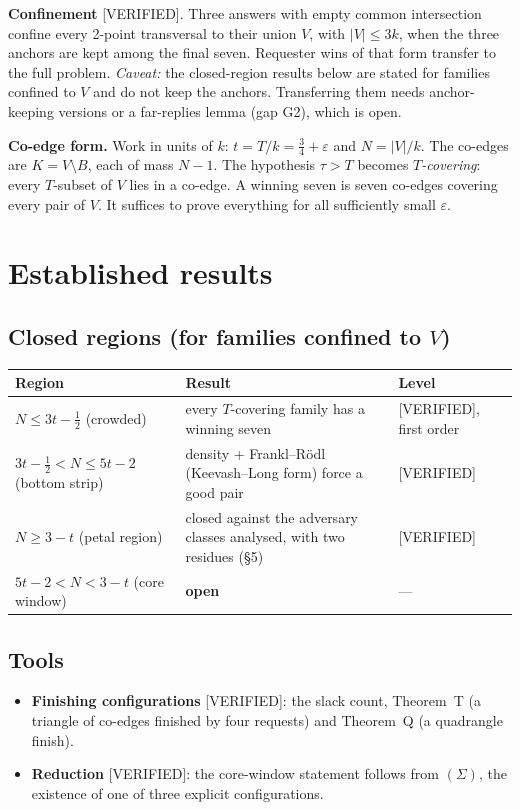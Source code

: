 \documentclass[11pt]{article}
\newcommand{\lvl}[1]{\textsf{\small[#1]}}
\begin{document}
\textbf{Confinement} \lvl{VERIFIED}. Three answers with empty common intersection confine every 2-point transversal to
their union $V$, with $|V|\le 3k$, when the three anchors are kept among the final seven. Requester wins of that form
transfer to the full problem. \emph{Caveat:} the closed-region results below are stated for families confined to $V$
and do not keep the anchors. Transferring them needs anchor-keeping versions or a far-replies lemma (gap G2), which is
open.

\textbf{Co-edge form.} Work in units of $k$: $t=T/k=\tfrac34+\varepsilon$ and $N=|V|/k$. The co-edges are
$K=V\setminus B$, each of mass $N-1$. The hypothesis $\tau>T$ becomes \emph{$T$-covering}: every $T$-subset of $V$ lies
in a co-edge. A winning seven is seven co-edges covering every pair of $V$. It suffices to prove everything for all
sufficiently small $\varepsilon$.

\section{Established results}
\subsection{Closed regions (for families confined to $V$)}
\begin{center}\small
\begin{tabular}{@{}p{5.3cm}p{6.4cm}p{3.4cm}@{}}\toprule
Region & Result & Level\\\midrule
$N\le 3t-\tfrac12$ (crowded) & every $T$-covering family has a winning seven & \lvl{VERIFIED}, first order\\
$3t-\tfrac12<N\le 5t-2$ (bottom strip) & density + Frankl--R\"odl (Keevash--Long form) force a good pair & \lvl{VERIFIED}\\
$N\ge 3-t$ (petal region) & closed against the adversary classes analysed, with two residues (\S5) & \lvl{VERIFIED}\\
$5t-2<N<3-t$ (core window) & \textbf{open} & ---\\\bottomrule
\end{tabular}
\end{center}

\subsection{Tools}
\begin{itemize}
\item \textbf{Finishing configurations} \lvl{VERIFIED}: the slack count, Theorem~T (a triangle of co-edges finished by
four requests) and Theorem~Q (a quadrangle finish).
\item \textbf{Reduction} \lvl{VERIFIED}: the core-window statement follows from $(\Sigma)$, the existence of one of
three explicit configurations.
\end{itemize}
\end{document}
